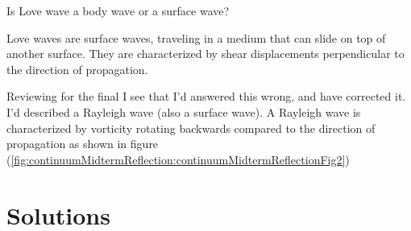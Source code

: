 \begin{Exercise}[title={Love waves.}, label={problem:elastic:displacements:midtermQ1d}]
Is Love wave a body wave or a surface wave?
\end{Exercise}

\begin{Answer}[ref={problem:elastic:displacements:midtermQ1d}]
Love waves are surface waves, traveling in a medium that can slide on top of another surface.  They are characterized by shear displacements perpendicular to the direction of propagation.

Reviewing for the final I see that I'd answered this wrong, and have corrected it.  I'd described a Rayleigh wave (also a surface wave).  A Rayleigh wave is characterized by vorticity rotating backwards compared to the direction of propagation as shown in figure (\ref{fig:continuumMidtermReflection:continuumMidtermReflectionFig2})


\end{Answer}

\section{Solutions}

\shipoutAnswer
